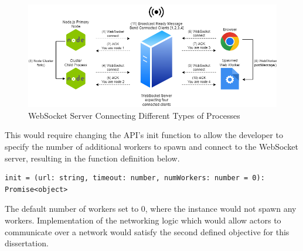 \documentclass[12pt, a4paper]{report}
\theoremstyle{definition}
\theoremstyle{definition}%
\theoremstyle{definition}%
\theoremstyle{definition}%
\theoremstyle{definition}%
\theoremstyle{definition}%
\begin{document}
\begin{figure}[H]
    \begin{centering}
        \includegraphics[width=\textwidth]{resources/websocketconnectioncomplex.png}
        \caption{WebSocket Server Connecting Different Types of Processes}
    \end{centering}
\end{figure}

This would require changing the API's init function to allow the developer to specify the number of additional workers to spawn and connect to the WebSocket server, resulting in the function definition below.
\begin{lstlisting}
init = (url: string, timeout: number, numWorkers: number = 0): Promise<object>
\end{lstlisting}
The default number of workers set to 0, where the instance would not spawn any workers. Implementation of the networking logic which would allow actors to communicate over a network would satisfy the second defined objective for this dissertation.
\end{document}
